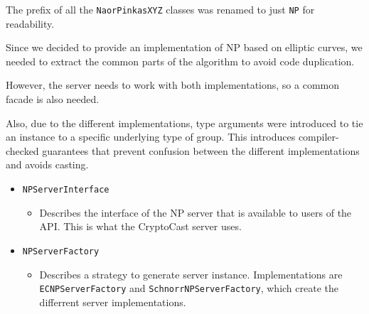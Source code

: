\documentclass[a4paper,10pt]{scrartcl}
\begin{document}
The prefix of all the \lstinline|NaorPinkasXYZ| classes was renamed to just \lstinline|NP| for readability.

Since we decided to provide an implementation of NP based on elliptic curves, we needed to extract
the common parts of the algorithm to avoid code duplication.

However, the server needs to work with both implementations, so a common facade is also needed.

Also, due to the different implementations, type arguments were introduced to tie an instance
to a specific underlying type of group. This introduces compiler-checked guarantees that prevent
confusion between the different implementations and avoids casting.

\begin{itemize}
  \item \lstinline|NPServerInterface|
	\begin{itemize}
		\item Describes the interface of the NP server that is available to users of the API.
		      This is what the CryptoCast server uses.
	\end{itemize}

	\item \lstinline|NPServerFactory|
	\begin{itemize}
		\item Describes a strategy to generate server instance. Implementations are
		      \lstinline|ECNPServerFactory| and \lstinline|SchnorrNPServerFactory|, which
					create the differrent server implementations.
	\end{itemize}
\end{itemize}
\end{document}
